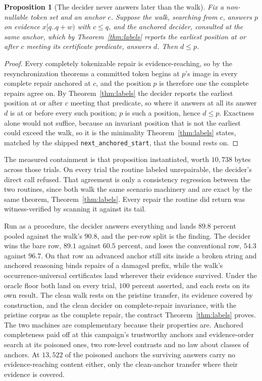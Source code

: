 \documentclass[11pt,a4paper]{article}
\theoremstyle{definition}
\theoremstyle{plain}
\newtheorem{proposition}{Proposition}
\theoremstyle{remark}
\newcommand{\code}[1]{\texttt{#1}}
\newcommand{\window}[3]{#1[#2..#3)}
\begin{document}
\begin{proposition}[The decider never answers later than the walk]
\label{prop:order}
Fix a non-nullable token set and an anchor $c$. Suppose the walk, searching from $c$, answers $p$ on evidence
$\window{x}{q}{q+w}$ with $c \le q$, and the anchored decider, consulted at the same anchor, which by
Theorem~\ref{thm:labels} reports the earliest position at or after $c$ meeting its certificate predicate, answers $d$.
Then $d \le p$.
\end{proposition}

\begin{proof}
Every completely tokenizable repair is evidence-reaching, so by the resynchronization theorems a committed token begins
at $p$'s image in every complete repair anchored at $c$, and the position $p$ is therefore one the complete repairs
agree on. By Theorem~\ref{thm:labels} the decider reports the earliest position at or after $c$ meeting that predicate,
so where it answers at all its answer $d$ is at or before every such position; $p$ is such a position, hence $d \le p$.
Exactness alone would not suffice, because an invariant position that is not the earliest could exceed the walk, so it
is the minimality Theorem~\ref{thm:labels} states, matched by the shipped \code{next\_anchored\_start}, that the bound
rests on.
\end{proof}

The measured containment is that proposition instantiated, worth $10{,}738$ bytes across those trials. On every trial
the routine labeled unrepairable, the decider's direct call refused. That agreement is only a consistency regression
between the two routines, since both walk the same scenario machinery and are exact by the same theorem,
Theorem~\ref{thm:labels}. Every repair the routine did return was witness-verified by scanning it against its tail.

Run as a procedure, the decider answers everything and lands $89.8$ percent pooled against the walk's $90.8$, and the
per-row split is the finding. The decider wins the bare row, $89.1$ against $60.5$ percent, and loses the conventional
row, $54.3$ against $96.7$. On that row an advanced anchor still sits inside a broken string and anchored reasoning
binds repairs of a damaged prefix, while the walk's occurrence-universal certificates land wherever their evidence
survived. Under the oracle floor both land on every trial, $100$ percent asserted, and each rests on its own result. The
clean walk rests on the pristine transfer, its evidence covered by construction, and the clean decider on
complete-repair invariance, with the pristine corpus as the complete repair, the contract Theorem~\ref{thm:labels}
proves. The two machines are complementary because their properties are. Anchored completeness paid off at this
campaign's trustworthy anchors and evidence-order search at its poisoned ones, two row-level contrasts and no law about
classes of anchors. At $13{,}522$ of the poisoned anchors the surviving answers carry no evidence-reaching content
either, only the clean-anchor transfer where their evidence is covered.
\end{document}
